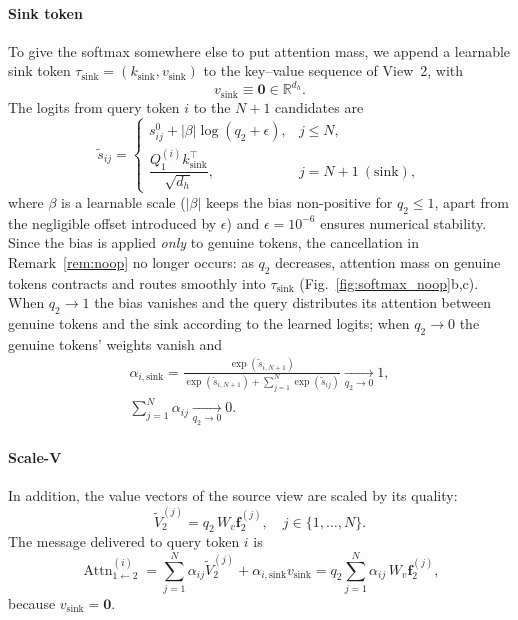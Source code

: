 \documentclass[final,5p,times,twocolumn,authoryear]{elsarticle}
\newcommand{\Attn}[1]{\operatorname{Attn}_{1\leftarrow 2}^{(#1)}}
\theoremstyle{plain}
\theoremstyle{remark}
\begin{document}
\paragraph{Sink token} To give the softmax somewhere else to put attention mass, we append a learnable sink token $\tau_{\text{sink}} = (k_{\text{sink}}, v_{\text{sink}})$ to the key--value sequence of View~2, with
\begin{equation}
  v_{\text{sink}} \equiv \mathbf{0} \in \mathbb{R}^{d_h}.
  \label{eq:v_sink_zero}
\end{equation}
The logits from query token $i$ to the $N+1$ candidates are
\begin{equation}
  \tilde{s}_{ij} =
  \begin{cases}
    s^{0}_{ij} + |\beta| \log(q_2 + \epsilon), & j \le N, \\[4pt]
    \dfrac{Q_1^{(i)} k_{\text{sink}}^\top}{\sqrt{d_h}}, & j = N+1 \ (\text{sink}),
  \end{cases}
  \label{eq:logits_qcsca}
\end{equation}
where $\beta$ is a learnable scale ($|\beta|$ keeps the bias non-positive for $q_2 \le 1$, apart from the negligible offset introduced by $\epsilon$) and $\epsilon = 10^{-6}$ ensures numerical stability. Since the bias is applied \emph{only} to genuine tokens, the cancellation in Remark~\ref{rem:noop} no longer occurs: as $q_2$ decreases, attention mass on genuine tokens contracts and routes smoothly into $\tau_{\text{sink}}$ (Fig.~\ref{fig:softmax_noop}b,c). When $q_2 \to 1$ the bias vanishes and the query distributes its attention between genuine tokens and the sink according to the learned logits; when $q_2 \to 0$ the genuine tokens' weights vanish and
\begin{equation}
\begin{gathered}
  \alpha_{i,\text{sink}} = \frac{\exp(\tilde{s}_{i,N+1})}{\exp(\tilde{s}_{i,N+1}) + \sum_{j=1}^N \exp(\tilde{s}_{ij})} \xrightarrow[q_2 \to 0]{} 1, \\
  \sum_{j=1}^N \alpha_{ij} \xrightarrow[q_2 \to 0]{} 0 .
\end{gathered}
\end{equation}

\paragraph{Scale-V} In addition, the value vectors of the source view are scaled by its quality:
\begin{equation}
  \tilde{V}_2^{(j)} = q_2 \, W_v \mathbf{f}_2^{(j)}, \quad j \in \{1, \dots, N\}.
  \label{eq:scale_v}
\end{equation}
The message delivered to query token $i$ is
\begin{equation}
  \Attn{i} = \sum_{j=1}^N \alpha_{ij} \tilde{V}_2^{(j)} + \alpha_{i,\text{sink}} v_{\text{sink}} = q_2 \sum_{j=1}^N \alpha_{ij}\, W_v \mathbf{f}_2^{(j)} ,
  \label{eq:attn_update}
\end{equation}
because $v_{\text{sink}} = \mathbf{0}$.
\end{document}
